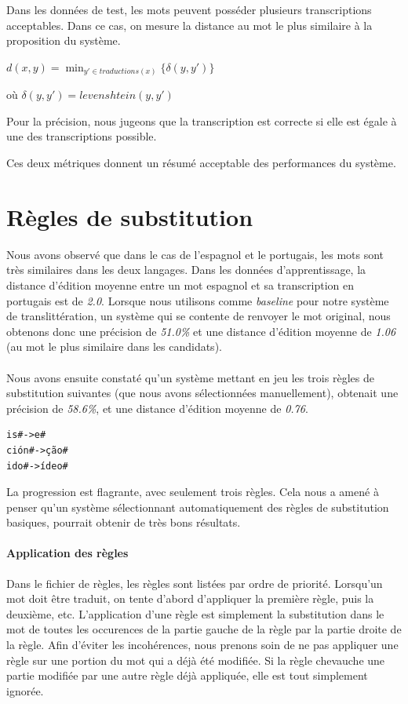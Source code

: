 \documentclass{article}
\begin{document}
Dans les données de test, les mots peuvent posséder plusieurs transcriptions acceptables. Dans ce cas, on mesure la distance au mot le plus similaire à la proposition du système.

$d(x,y) = \min_{y' \in traductions(x)} \{\delta(y,y')\}$

où $\delta(y,y')=levenshtein(y,y')$

Pour la précision, nous jugeons que la transcription est correcte si elle est égale à une des transcriptions possible.

Ces deux métriques donnent un résumé acceptable des performances du système.

\section{Règles de substitution}
Nous avons observé que dans le cas de l'espagnol et le portugais, les mots sont très similaires dans les deux langages. Dans les données d'apprentissage, la distance d'édition moyenne entre un mot espagnol et sa transcription en portugais est de \emph{2.0}.
Lorsque nous utilisons comme \emph{baseline} pour notre système de translittération, un système qui se contente de renvoyer le mot original, nous obtenons donc une précision de \emph{51.0\%} et une distance d'édition moyenne de \emph{1.06} (au mot le plus similaire dans les candidats).

\paragraph{}
Nous avons ensuite constaté qu'un système mettant en jeu les trois règles de substitution suivantes (que nous avons sélectionnées manuellement), obtenait une précision de \emph{58.6\%}, et une distance d'édition moyenne de \emph{0.76}.
\begin{verbatim}
is#->e#
ción#->ção#
ido#->ídeo#
\end{verbatim}
La progression est flagrante, avec seulement trois règles. Cela nous a amené à penser qu'un système sélectionnant automatiquement des règles de substitution basiques, pourrait obtenir de très bons résultats.

\paragraph{Application des règles}
Dans le fichier de règles, les règles sont listées par ordre de priorité. Lorsqu'un mot doit être traduit, on tente d'abord d'appliquer la première règle, puis la deuxième, etc.  L'application d'une règle est simplement la substitution dans le mot de toutes les occurences de la partie gauche de la règle par la partie droite de la règle. Afin d'éviter les incohérences, nous prenons soin de ne pas appliquer une règle sur une portion du mot qui a déjà été modifiée. Si la règle chevauche une partie modifiée par une autre règle déjà appliquée, elle est tout simplement ignorée.
\end{document}
